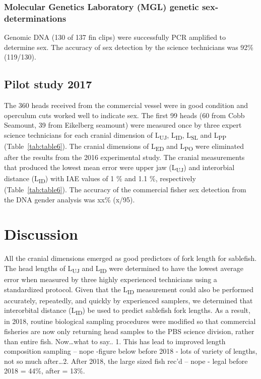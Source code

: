\documentclass[12pt]{article}\usepackage[]{graphicx}\usepackage[]{color}
\begin{document}
\hypertarget{molecular-genetics-laboratory-mgl-genetic-sex-determinations}{%
\subsubsection{Molecular Genetics Laboratory (MGL) genetic sex-determinations}\label{molecular-genetics-laboratory-mgl-genetic-sex-determinations}}

Genomic DNA (130 of 137 fin clips) were successfully PCR amplified to determine sex. The accuracy of sex detection by the science technicians was 92\% (119/130).

\hypertarget{pilot-study-2017-1}{%
\subsection{Pilot study 2017}\label{pilot-study-2017-1}}

The 360 heads received from the commercial vessel were in good condition and operculum cuts worked well to indicate sex. The first 99 heads (60 from Cobb Seamount, 39 from Eikelberg seamount) were measured once by three expert science technicians for each cranial dimension of L\textsubscript{UJ}, L\textsubscript{ID}, L\textsubscript{SL} and L\textsubscript{PP} (Table~\ref{tab:table6}). The cranial dimensions of L\textsubscript{ED} and L\textsubscript{PO} were eliminated after the results from the 2016 experimental study. The cranial measurements that produced the lowest mean error were upper jaw (L\textsubscript{UJ}) and interorbial distance (L\textsubscript{ID}) with IAE values of 1 \% and 1.1 \%, respectively (Table~\ref{tab:table6}). The accuracy of the commercial fisher sex detection from the DNA gender analysis was xx\% (x/95).

\hypertarget{discussion}{%
\section{Discussion}\label{discussion}}

All the cranial dimensions emerged as good predictors of fork length for sablefish. The head lengths of L\textsubscript{UJ} and L\textsubscript{ID} were determined to have the lowest average error when measured by three highly experienced technicians using a standardized protocol. Given that the L\textsubscript{ID} measurement could also be performed accurately, repeatedly, and quickly by experienced samplers, we determined that interorbital distance (L\textsubscript{ID}) be used to predict sablefish fork lengths. As a result, in 2018, routine biological sampling procedures were modified so that commercial fisheries are now only returning head samples to the PBS science division, rather than entire fish. Now\ldots what to say.. 1. This has lead to improved length composition sampling -- nope -figure below before 2018 - lots of variety of lengths, not so much after\ldots2. After 2018, the large sized fish rec'd -- nope - legal before 2018 = 44\%, after = 13\%.
\end{document}

